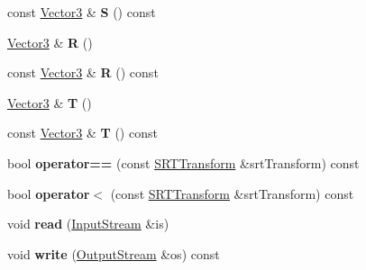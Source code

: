 \begin{DoxyCompactItemize}
\item 
const \hyperlink{class_i_dream_sky_1_1_vector3}{Vector3} \& {\bfseries S} () const \hypertarget{class_i_dream_sky_1_1_s_r_t_transform_ab9c2caaf2047ff77d82e87f0e181f1dc}{}\label{class_i_dream_sky_1_1_s_r_t_transform_ab9c2caaf2047ff77d82e87f0e181f1dc}

\item 
\hyperlink{class_i_dream_sky_1_1_vector3}{Vector3} \& {\bfseries R} ()\hypertarget{class_i_dream_sky_1_1_s_r_t_transform_a35cfa0d67fdc33c0feeb7f727269fa56}{}\label{class_i_dream_sky_1_1_s_r_t_transform_a35cfa0d67fdc33c0feeb7f727269fa56}

\item 
const \hyperlink{class_i_dream_sky_1_1_vector3}{Vector3} \& {\bfseries R} () const \hypertarget{class_i_dream_sky_1_1_s_r_t_transform_a25aff7e734d22ddeeee3cb5360a47116}{}\label{class_i_dream_sky_1_1_s_r_t_transform_a25aff7e734d22ddeeee3cb5360a47116}

\item 
\hyperlink{class_i_dream_sky_1_1_vector3}{Vector3} \& {\bfseries T} ()\hypertarget{class_i_dream_sky_1_1_s_r_t_transform_a65e17fbd33cb21d92faed7a1f793d5d6}{}\label{class_i_dream_sky_1_1_s_r_t_transform_a65e17fbd33cb21d92faed7a1f793d5d6}

\item 
const \hyperlink{class_i_dream_sky_1_1_vector3}{Vector3} \& {\bfseries T} () const \hypertarget{class_i_dream_sky_1_1_s_r_t_transform_a696f83a07e18633e9ff596d6c618298f}{}\label{class_i_dream_sky_1_1_s_r_t_transform_a696f83a07e18633e9ff596d6c618298f}

\item 
bool {\bfseries operator==} (const \hyperlink{class_i_dream_sky_1_1_s_r_t_transform}{S\+R\+T\+Transform} \&srt\+Transform) const \hypertarget{class_i_dream_sky_1_1_s_r_t_transform_a6e2f756d5c299def7736e2b35e9e2ebe}{}\label{class_i_dream_sky_1_1_s_r_t_transform_a6e2f756d5c299def7736e2b35e9e2ebe}

\item 
bool {\bfseries operator$<$} (const \hyperlink{class_i_dream_sky_1_1_s_r_t_transform}{S\+R\+T\+Transform} \&srt\+Transform) const \hypertarget{class_i_dream_sky_1_1_s_r_t_transform_a6e7544b89b4c8a1731cb61159cc26390}{}\label{class_i_dream_sky_1_1_s_r_t_transform_a6e7544b89b4c8a1731cb61159cc26390}

\item 
void {\bfseries read} (\hyperlink{class_i_dream_sky_1_1_input_stream}{Input\+Stream} \&is)\hypertarget{class_i_dream_sky_1_1_s_r_t_transform_a453043db8543fa9d785d95e9a600e613}{}\label{class_i_dream_sky_1_1_s_r_t_transform_a453043db8543fa9d785d95e9a600e613}

\item 
void {\bfseries write} (\hyperlink{class_i_dream_sky_1_1_output_stream}{Output\+Stream} \&os) const \hypertarget{class_i_dream_sky_1_1_s_r_t_transform_a185ab9a35807408856a490f7f8d1b679}{}\label{class_i_dream_sky_1_1_s_r_t_transform_a185ab9a35807408856a490f7f8d1b679}

\end{DoxyCompactItemize}
